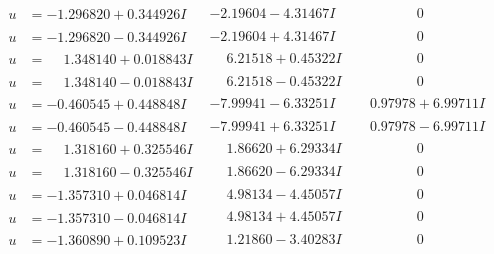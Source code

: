 \documentclass[1p]{elsarticle_modified}
\theoremstyle{definition}
\begin{document}
$$\begin{array}{c|c|c}
\begin{aligned}
u &= -1.296820 + 0.344926 I\end{aligned}
 & -2.19604 - 4.31467 I & \phantom{-0.000000 } 0 \\ \hline\begin{aligned}
u &= -1.296820 - 0.344926 I\end{aligned}
 & -2.19604 + 4.31467 I & \phantom{-0.000000 } 0 \\ \hline\begin{aligned}
u &= \phantom{-}1.348140 + 0.018843 I\end{aligned}
 & \phantom{-}6.21518 + 0.45322 I & \phantom{-0.000000 } 0 \\ \hline\begin{aligned}
u &= \phantom{-}1.348140 - 0.018843 I\end{aligned}
 & \phantom{-}6.21518 - 0.45322 I & \phantom{-0.000000 } 0 \\ \hline\begin{aligned}
u &= -0.460545 + 0.448848 I\end{aligned}
 & -7.99941 - 6.33251 I & \phantom{-}0.97978 + 6.99711 I \\ \hline\begin{aligned}
u &= -0.460545 - 0.448848 I\end{aligned}
 & -7.99941 + 6.33251 I & \phantom{-}0.97978 - 6.99711 I \\ \hline\begin{aligned}
u &= \phantom{-}1.318160 + 0.325546 I\end{aligned}
 & \phantom{-}1.86620 + 6.29334 I & \phantom{-0.000000 } 0 \\ \hline\begin{aligned}
u &= \phantom{-}1.318160 - 0.325546 I\end{aligned}
 & \phantom{-}1.86620 - 6.29334 I & \phantom{-0.000000 } 0 \\ \hline\begin{aligned}
u &= -1.357310 + 0.046814 I\end{aligned}
 & \phantom{-}4.98134 - 4.45057 I & \phantom{-0.000000 } 0 \\ \hline\begin{aligned}
u &= -1.357310 - 0.046814 I\end{aligned}
 & \phantom{-}4.98134 + 4.45057 I & \phantom{-0.000000 } 0 \\ \hline\begin{aligned}
u &= -1.360890 + 0.109523 I\end{aligned}
 & \phantom{-}1.21860 - 3.40283 I & \phantom{-0.000000 } 0 \\ \hline\begin{aligned}

\end{aligned}
\end{array}$$
\end{document}
